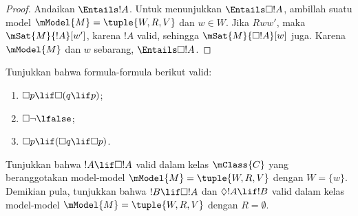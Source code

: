 \documentclass[../../../include/open-logic-section]{subfiles}
\begin{document}
\begin{proof}
  Andaikan $\Entails !A$. Untuk menunjukkan $\Entails \Box!A$, ambillah
  suatu model $\mModel{M} = \tuple{W, R, V}$ dan $w \in W$. Jika $Rww'$,
  maka $\mSat{M}{!A}[w']$, karena $!A$ valid, sehingga
  $\mSat{M}{\Box!A}[w]$ juga. Karena $\mModel{M}$ dan $w$ sebarang,
  $\Entails \Box!A$.
\end{proof}

\begin{prob}
  Tunjukkan bahwa formula-formula berikut valid:
  \begin{enumerate}
  \item $\Box p \lif \Box (q \lif p)$;
  \item $\Box \lnot \lfalse$;
  \item $\Box p \lif (\Box q \lif \Box p)$.
  \end{enumerate}
\end{prob}

\begin{prob}
  Tunjukkan bahwa $!A \lif \Box!A$ valid dalam kelas $\mClass{C}$ yang
  beranggotakan model-model $\mModel{M} = \tuple{W, R, V}$ dengan
  $W = \{w\}$. Demikian pula, tunjukkan bahwa $!B \lif \Box !A$ dan
  $\Diamond !A \lif !B$ valid dalam kelas model-model
  $\mModel{M} = \tuple{W, R, V}$ dengan $R = \emptyset$.
\end{prob}
\end{document}
